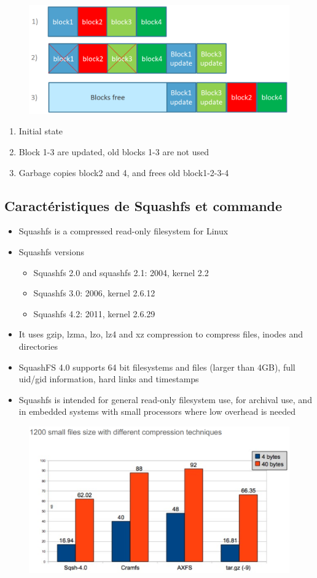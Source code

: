 \documentclass[resume]{subfiles}
\begin{document}
\begin{figure}[H]
    \centering
    \includegraphics[width=0.6\columnwidth]{Figures/fileSystem/log_fs.png}
    \label{fig:log_fs}
\end{figure}
\begin{enumerate}
    \item Initial state
    \item Block 1-3 are updated, old blocks 1-3 are not used
    \item Garbage copies block2 and 4, and frees old block1-2-3-4
\end{enumerate}

\subsection{Caractéristiques de Squashfs et commande}
\begin{itemize}
    \item Squashfs is a compressed read-only filesystem for Linux
    \item Squashfs versions
    \begin{itemize}
        \item Squashfs 2.0 and squashfs 2.1: 2004, kernel 2.2
        \item Squashfs 3.0: 2006, kernel 2.6.12
        \item Squashfs 4.2: 2011, kernel 2.6.29
    \end{itemize}
    \item It uses gzip, lzma, lzo, lz4 and xz compression to compress files, inodes and directories
    \item SquashFS 4.0 supports 64 bit filesystems and files (larger than 4GB), full uid/gid information, hard links and timestamps
    \item Squashfs is intended for general read-only filesystem use, for archival use, and in embedded systems with small processors where low overhead is needed
\end{itemize}

\begin{figure}[H]
    \centering
    \includegraphics[width=0.75\columnwidth]{Figures/fileSystem/squashSystPerf.png}
    \label{fig:squashSystPerf}
\end{figure}
\end{document}
